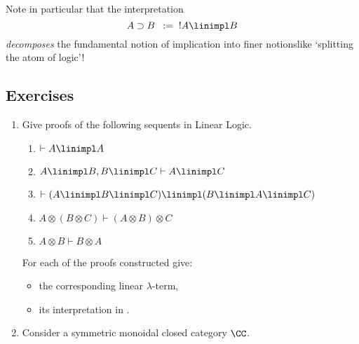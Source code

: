 \documentclass{svmult}
\begin{document}
Note in particular that the interpretation
\[ A \supset B \;\; := \;\; !A \linimpl B \]
\emph{decomposes} the fundamental notion of {implication} into finer notions\HY like `splitting the  atom of logic'!

\subsection{Exercises}
\begin{enumerate}\renewcommand{\theenumi}{\textbf{\arabic{enumi}}}
  \item Give proofs of the following sequents in Linear Logic.
    \begin{enumerate}
    \item $\vdash A \linimpl A$
    \item $ A \linimpl B , B \linimpl C \vdash A \linimpl C$
    \item $\vdash (A \linimpl B \linimpl C) \linimpl (B \linimpl A \linimpl C)$
    \item $A \otimes (B \otimes C) \vdash (A \otimes B) \otimes C$
    \item $A \otimes B \vdash B \otimes A$
    \end{enumerate}
    For each of the proofs constructed give:
    \begin{itemize}
    \item the corresponding linear $\lambda$-term,
    \item its interpretation in \Rel.
    \end{itemize}
  \item Consider a symmetric monoidal closed category $\CC$.
\end{enumerate}
\end{document}
